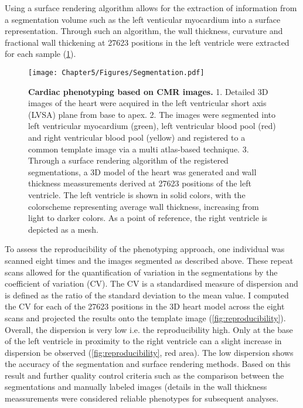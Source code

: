 Using a surface rendering algorithm allows for the extraction of information from a segmentation volume such as the left venticular myocardium into a surface representation. Through such an algorithm, the wall thickness, curvature and  fractional wall thickening at \num{27623} positions in the left ventricle were extracted for each sample (\cref{fig:segmentation}). %
\\

\begin{figure}[h]
	\centering
	\texttt{[image: Chapter5/Figures/Segmentation.pdf]}
	\caption[\textbf{Cardiac phenotyping based on CMR images. }]{\textbf{Cardiac phenotyping based on CMR images. }1. Detailed 3D images of the heart were acquired in the left ventricular short axis (LVSA) plane from base to apex. 2. The images were segmented into left ventricular myocardium (green), left ventricular blood pool (red) and right ventricular blood pool (yellow) and registered to a common template image via a multi atlas-based technique. 3. Through a surface rendering algorithm of the registered segmentations, a 3D model of the heart was generated and wall thickness meassurements derived at \num{27623} positions of the left ventricle. The left ventricle is shown in solid colors, with the colorscheme representing average wall thickness, increasing from light to darker colors. As a point of reference, the right ventricle is depicted as a mesh.}
 	\label{fig:segmentation}
\end{figure}

To assess the reproducibility of the phenotyping approach, one individual was scanned eight times and the images segmented as described above. These repeat scans allowed for the quantification of variation in the segmentations by the coefficient of variation (CV). The CV is a standardised measure of dispersion and is defined as the ratio of the standard deviation to the mean value. I computed the CV for each of the \num{27623} positions in the 3D heart model across the eight scans and projected the results onto the template image (\cref{fig:reproducibility}). Overall, the dispersion is very low i.e. the reproducibility high. Only at the base of the left ventricle in proximity to the right ventricle can a slight increase in dispersion be observed (\cref{fig:reproducibility}, red area). The low dispersion shows the accuracy of the segmentation and surface rendering methods. Based on this result and further quality control criteria such as the comparison between the segmentations and manually labeled images (details in \citep{DeMarvao2014} the wall thickness meassurements were considered reliable phenotypes for subsequent analyses. 
\\ 

